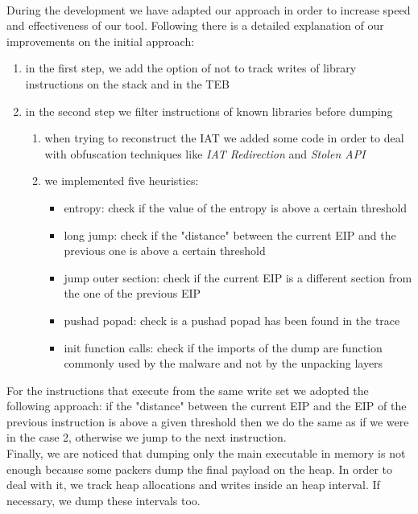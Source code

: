 \paragraph{}
During the development we have adapted our approach in order to increase speed and effectiveness of our tool. Following there is a detailed explanation of our improvements on the initial approach:
\begin{enumerate}
\item in the first step, we add the option of not to track writes of library instructions on the stack and in the TEB
\item in the second step we filter instructions of known libraries before dumping
	\begin{enumerate}
	\item when trying to reconstruct the IAT we added some code in order to deal with 			obfuscation techniques like \textit{IAT Redirection} and \textit{Stolen API}
	\item we implemented five heuristics:
		\begin{itemize}
		\item entropy: check if the value of the entropy is above a certain threshold
		\item long jump: check if the "distance" between the current EIP and the previous 			one is above a certain threshold
		\item jump outer section: check if the current EIP is a different section from the 		one of the previous EIP
		\item pushad popad: check is a pushad popad has been found in the trace
		\item init function calls: check if the imports of the dump are function commonly 			 used by the malware and not by the unpacking layers
		\end{itemize}
	\end{enumerate}
\end{enumerate} 
For the instructions that execute from the same write set we adopted the following approach: if the "distance" between the current EIP and the EIP of the previous instruction is above a given threshold then we do the same as if we were in the case 2, otherwise we jump to the next instruction.\\
Finally, we are noticed that dumping only the main executable in memory is not enough because some packers dump the final payload on the heap. In order to deal with it, we track heap allocations and writes inside an heap interval. If necessary, we dump these intervals too.


